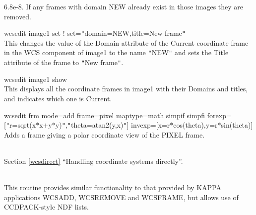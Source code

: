 \documentclass[twoside,11pt]{article}
\newcommand{\htmlref}[2]{#1}
\newcommand{\latexhtml}[2]{#1}
\newcommand{\xref}[3]{#1}
\renewcommand{\_}{\texttt{\symbol{95}}}
\newcommand{\secref}[2]{\latexhtml{Section \ref{#1} ``#2''}{``\htmlref{#2}{#1}''}}
\newcommand{\sstexamplesubsection}[2]{\sloppy \item{\ssttt #1} \mbox{} \\ #2 }
\newcommand{\sstnotes}[1]{\item[Notes:] \mbox{} \\[1.3ex] #1}
\newcommand{\sstdiytopic}[2]{\item[#1:] \mbox{} \\[1.3ex] #2}
\newcommand{\sstitem}{\item}
\newcommand{\sstexamplesubsection}[2]{\item[{\ssttt #1}] #2}
\newcommand{\sstnotes}[1]{\item[Notes:] #1 }
\newcommand{\sstdiytopic}[2]{\item[{#1:}] #2 }
\newcommand{\sstitem}{\item}
\begin{document}
{{{{            \sstitem
            6.8e-8.  If any frames with domain NEW already exist in
            those images they are removed.
         }
      }
      \sstexamplesubsection{
         wcsedit image1 set ! set={\tt "}domain=NEW,title=New frame{\tt "}
      }{
         This changes the value of the Domain attribute of the Current
         coordinate frame in the WCS component of image1 to the name
         {\tt "}NEW{\tt "} and  sets the Title attribute of the frame to {\tt "}New
         frame{\tt "}.
      }
      \sstexamplesubsection{
         wcsedit image1 show
      }{
         This displays all the coordinate frames in image1 with their
         Domains and titles, and indicates which one is Current.
      }
      \sstexamplesubsection{
         wcsedit frm mode=add frame=pixel maptype=math simpif simpfi
              forexp=[{\tt "}r=sqrt(x$*$x$+$y$*$y){\tt "},{\tt "}theta=atan2(y,x){\tt "}]
              invexp=[x=r$*$cos(theta),y=r$*$sin(theta)]
      }{
         Adds a frame giving a polar coordinate view of the PIXEL frame.
      }
   }
   \sstdiytopic{
      See also
   } {
      \secref{wcsdirect}{Handling coordinate systems directly}.
   }
   \sstnotes{
      This routine provides similar functionality to that provided by
      \xref{KAPPA}{sun95}{} applications 
      \xref{WCSADD}{sun95}{WCSADD}, 
      \xref{WCSREMOVE}{sun95}{WCSREMOVE} and 
      \xref{WCSFRAME}{sun95}{WCSFRAME}, but allows
      use of CCDPACK-style NDF lists.
   }
}
\end{document}
